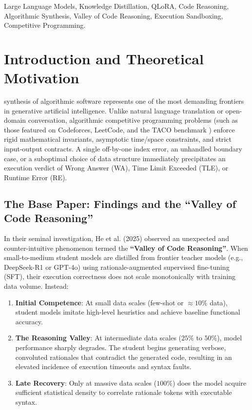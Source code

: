 \documentclass[lettersize,journal]{IEEEtran}
\begin{document}
\begin{IEEEkeywords}
Large Language Models, Knowledge Distillation, QLoRA, Code Reasoning, Algorithmic Synthesis, Valley of Code Reasoning, Execution Sandboxing, Competitive Programming.
\end{IEEEkeywords}

\section{Introduction and Theoretical Motivation}
 synthesis of algorithmic software represents one of the most demanding frontiers in generative artificial intelligence. Unlike natural language translation or open-domain conversation, algorithmic competitive programming problems (such as those featured on Codeforces, LeetCode, and the TACO benchmark \cite{li2023taco}) enforce rigid mathematical invariants, asymptotic time/space constraints, and strict input-output contracts. A single off-by-one index error, an unhandled boundary case, or a suboptimal choice of data structure immediately precipitates an execution verdict of Wrong Answer (WA), Time Limit Exceeded (TLE), or Runtime Error (RE).

\subsection{The Base Paper: Findings and the ``Valley of Code Reasoning''}
In their seminal investigation, He et al. (2025) \cite{he2025valley} observed an unexpected and counter-intuitive phenomenon termed the \textbf{``Valley of Code Reasoning''}. When small-to-medium student models are distilled from frontier teacher models (e.g., DeepSeek-R1 or GPT-4o) using rationale-augmented supervised fine-tuning (SFT), their execution correctness does not scale monotonically with training data volume. Instead:
\begin{enumerate}
    \item \textbf{Initial Competence}: At small data scales (few-shot or $\approx 10\%$ data), student models imitate high-level heuristics and achieve baseline functional accuracy.
    \item \textbf{The Reasoning Valley}: At intermediate data scales ($25\%$ to $50\%$), model performance sharply degrades. The student begins generating verbose, convoluted rationales that contradict the generated code, resulting in an elevated incidence of execution timeouts and syntax faults.
    \item \textbf{Late Recovery}: Only at massive data scales ($100\%$) does the model acquire sufficient statistical density to correlate rationale tokens with executable syntax.
\end{enumerate}
\end{document}
